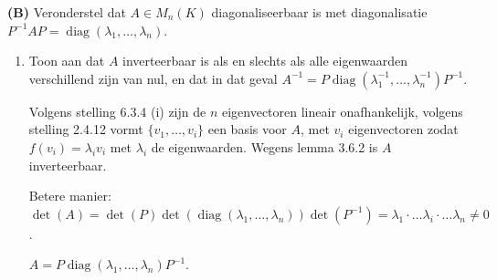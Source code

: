 \begin{oefening}[6.3.5] \textbf{(B)}
    Veronderstel dat $A \in M_n(K)$ diagonaliseerbaar is met diagonalisatie $P^{-1}AP = \operatorname{diag}(\lambda_1, \dots, \lambda_n)$.
    \begin{enumerate}
        \item[(a)] Toon aan dat $A$ inverteerbaar is als en slechts als alle eigenwaarden verschillend zijn van nul, en dat in dat geval $A^{-1} = P \operatorname{diag}(\lambda_1^{-1}, \dots, \lambda_n^{-1})P^{-1}$.
        
        Volgens stelling 6.3.4 (i) zijn de \(n\) eigenvectoren lineair onafhankelijk,
        volgens stelling 2.4.12 vormt \(\{v_1,\dots,v_i\}\) een basis voor \(A\), met \(v_i\) eigenvectoren zodat \(f(v_i) = \lambda_i v_i\) met \(\lambda_i\) de eigenwaarden.
        Wegens lemma 3.6.2 is \(A\) inverteerbaar.

        Betere manier:
        \(\det(A) = \det(P) \det(\operatorname{diag}(\lambda_1, \dots, \lambda_n)) \det(P^{-1}) = \lambda_1 \cdot \dots \lambda_i \cdot \dots \lambda_n \neq 0\).

        \(A = P \operatorname{diag}(\lambda_1, \dots, \lambda_n) P^{-1} \).


\end{enumerate}
\end{oefening}
